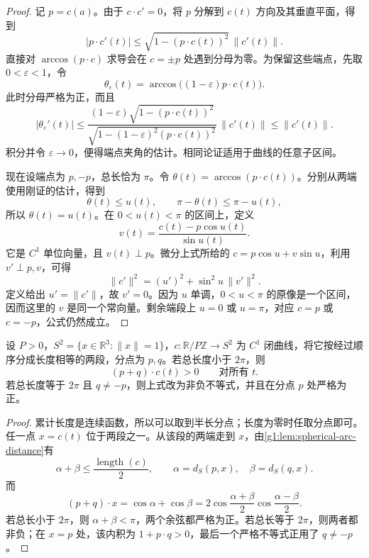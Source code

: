 \begin{proof}
	记 \(p=c(a)\)。由于 \(c\cdot c'=0\)，将 \(p\) 分解到 \(c(t)\) 方向及其垂直平面，得到
	\[
		|p\cdot c'(t)|\le\sqrt{1-(p\cdot c(t))^2}\,\|c'(t)\|.
	\]
	直接对 \(\arccos(p\cdot c)\) 求导会在 \(c=\pm p\) 处遇到分母为零。为保留这些端点，先取 \(0<\varepsilon<1\)，令
	\[
		\theta_\varepsilon(t)=\arccos\bigl((1-\varepsilon)p\cdot c(t)\bigr).
	\]
	此时分母严格为正，而且
	\[
		|\theta_\varepsilon'(t)|
		\le
		\frac{(1-\varepsilon)\sqrt{1-(p\cdot c(t))^2}}
		{\sqrt{1-(1-\varepsilon)^2(p\cdot c(t))^2}}\,
		\|c'(t)\|
		\le\|c'(t)\|.
	\]
	积分并令 \(\varepsilon\to0\)，便得端点夹角的估计。相同论证适用于曲线的任意子区间。

	现在设端点为 \(p,-p\)，总长恰为 \(\pi\)。令 \(\theta(t)=\arccos(p\cdot c(t))\)。分别从两端使用刚证的估计，得到
	\[
		\theta(t)\le u(t),\qquad
		\pi-\theta(t)\le\pi-u(t),
	\]
	所以 \(\theta(t)=u(t)\)。在 \(0<u(t)<\pi\) 的区间上，定义
	\[
		v(t)=\frac{c(t)-p\cos u(t)}{\sin u(t)}.
	\]
	它是 \(C^1\) 单位向量，且 \(v(t)\perp p\)。微分上式所给的 \(c=p\cos u+v\sin u\)，利用 \(v'\perp p,v\)，可得
	\[
		\|c'\|^2=(u')^2+\sin^2u\,\|v'\|^2.
	\]
	定义给出 \(u'=\|c'\|\)，故 \(v'=0\)。因为 \(u\) 单调，\(0<u<\pi\) 的原像是一个区间，因而这里的 \(v\) 是同一个常向量。剩余端段上 \(u=0\) 或 \(u=\pi\)，对应 \(c=p\) 或 \(c=-p\)，公式仍然成立。
\end{proof}

\begin{lemma}\label{g1:lem:short-spherical-loop}
	设 \(P>0\)，\(S^2=\{x\in\mathbb R^3:\|x\|=1\}\)，\(c:\mathbb R/P\mathbb Z\to S^2\) 为 \(C^1\) 闭曲线，将它按经过顺序分成长度相等的两段，分点为 \(p,q\)。若总长度小于 \(2\pi\)，则
	\[
		(p+q)\cdot c(t)>0\qquad\text{对所有 }t.
	\]
	若总长度等于 \(2\pi\) 且 \(q\ne-p\)，则上式改为非负不等式，并且在分点 \(p\) 处严格为正。
\end{lemma}

\begin{proof}
	累计长度是连续函数，所以可以取到半长分点；长度为零时任取分点即可。任一点 \(x=c(t)\) 位于两段之一。从该段的两端走到 \(x\)，由\cref{g1:lem:spherical-arc-distance}有
	\[
		\alpha+\beta\le\frac{\operatorname{length}(c)}2,\qquad
		\alpha=d_S(p,x),\quad\beta=d_S(q,x).
	\]
	而
	\[
		(p+q)\cdot x=\cos\alpha+\cos\beta
		=2\cos\frac{\alpha+\beta}{2}\cos\frac{\alpha-\beta}{2}.
	\]
	若总长小于 \(2\pi\)，则 \(\alpha+\beta<\pi\)，两个余弦都严格为正。若总长等于 \(2\pi\)，则两者都非负；在 \(x=p\) 处，该内积为 \(1+p\cdot q>0\)，最后一个严格不等式正用了 \(q\ne-p\)。
\end{proof}


